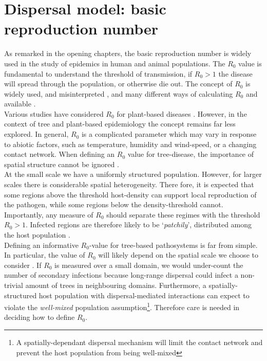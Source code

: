 
\section{Dispersal model: basic reproduction number}

As remarked in the opening chapters, the basic reproduction number is widely used in the %
study of epidemics in human and animal populations. %
The $R_0$ value is fundamental to understand the threshold of transmission, if $R_0>1$ the %
disease will spread through the population, or otherwise die out. The concept of $R_0$ is %
widely used, and misinterpreted \cite{delamater2019complexity}, and many different ways of %
calculating $R_0$ and available \cite{perspectives-on-r0}.\\

Various studies have considered $R_0$ for plant-based diseases %
\cite{gubbins2000population, park2001invasion, doi:10.1146/annurev.phyto.011108.135838, van2011periodic, mikaberidze2016invasiveness}. %
However, in the context of tree and plant-based epidemiology the concept remains far less %
explored. In general, $R_0$ is a complicated parameter which may vary in response to abiotic %
factors, such as temperature, humidity and wind-speed, or a changing contact network. %
When defining an $R_0$ value for tree-disease, the importance of spatial structure cannot be %
ignored \cite{park2001invasion}.\\

At the small scale we have a uniformly structured population. %
However, for larger scales there is considerable spatial heterogeneity. %
There fore, it is expected that some regions above the threshold host-density can support %
local reproduction of the pathogen, while some regions below the density-threshold cannot. %
Importantly, any measure of $R_0$ should separate these regimes with the threshold $R_0>1$. %
Infected regions are therefore likely to be `\textit{patchily}', distributed among the host %
population \cite{park2001invasion}.\\

Defining an informative $R_0$-value for tree-based pathosystems is far from simple. %
In particular, the value of $R_0$ will likely depend on the spatial scale we choose to %
consider \cite{mikaberidze2016invasiveness}. %
If  $R_0$ is measured over a small domain, we would under-count the number of secondary %
infections because long-range dispersal could infect a non-trivial amount of trees in %
neighbouring domains. %
Furthermore, a spatially-structured host population with dispersal-mediated interactions %
can expect to violate the \textit{well-mixed} population assumption\footnote{A spatially-dependant dispersal mechanism will limit the contact network and prevent the host population from being well-mixed}. 
Therefore care is needed in deciding how to define $R_0$.\\

